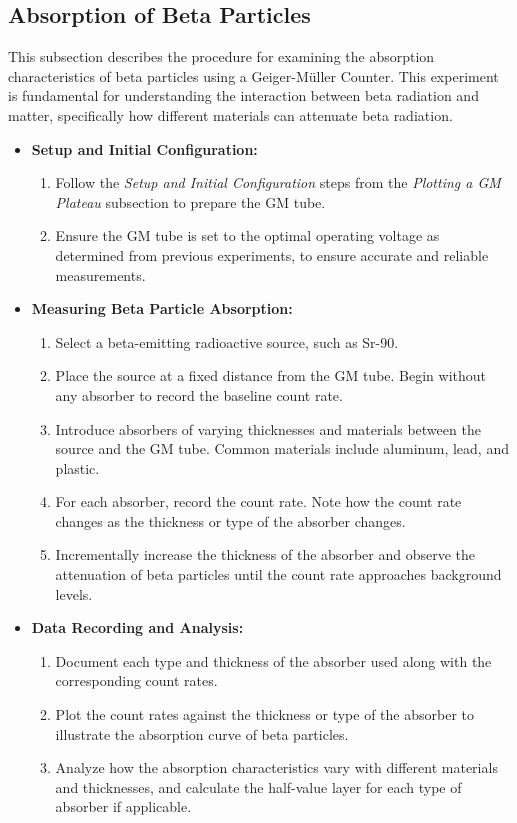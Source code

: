 \documentclass[11pt]{article}
\begin{document}
	\subsection{Absorption of Beta Particles}
	
	This subsection describes the procedure for examining the absorption characteristics of beta particles using a Geiger-Müller Counter. This experiment is fundamental for understanding the interaction between beta radiation and matter, specifically how different materials can attenuate beta radiation.
	
	\begin{itemize}
		\item \textbf{Setup and Initial Configuration:}
		\begin{enumerate}
			\item Follow the \textit{Setup and Initial Configuration} steps from the \textit{Plotting a GM Plateau} subsection to prepare the GM tube.
			\item Ensure the GM tube is set to the optimal operating voltage as determined from previous experiments, to ensure accurate and reliable measurements.
		\end{enumerate}
		
		\item \textbf{Measuring Beta Particle Absorption:}
		\begin{enumerate}
			\item Select a beta-emitting radioactive source, such as Sr-90.
			\item Place the source at a fixed distance from the GM tube. Begin without any absorber to record the baseline count rate.
			\item Introduce absorbers of varying thicknesses and materials between the source and the GM tube. Common materials include aluminum, lead, and plastic.
			\item For each absorber, record the count rate. Note how the count rate changes as the thickness or type of the absorber changes.
			\item Incrementally increase the thickness of the absorber and observe the attenuation of beta particles until the count rate approaches background levels.
		\end{enumerate}
		
		\item \textbf{Data Recording and Analysis:}
		\begin{enumerate}
			\item Document each type and thickness of the absorber used along with the corresponding count rates.
			\item Plot the count rates against the thickness or type of the absorber to illustrate the absorption curve of beta particles.
			\item Analyze how the absorption characteristics vary with different materials and thicknesses, and calculate the half-value layer for each type of absorber if applicable.
		\end{enumerate}
		

\end{itemize}
\end{document}
